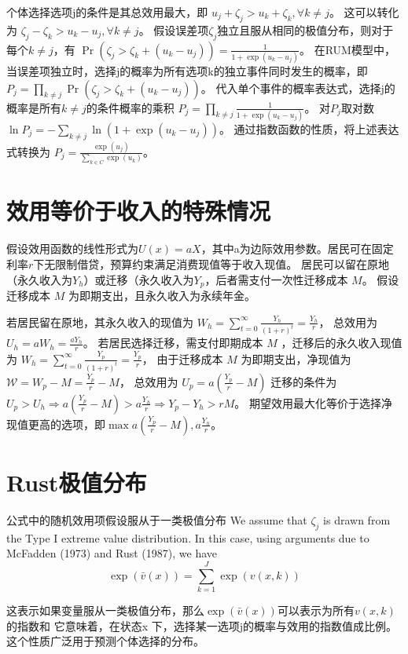 \documentclass[a4paper,12pt,oneside]{book} %
\begin{document}
个体选择选项j的条件是其总效用最大，即
$u_j + \zeta_j > u_k + \zeta_k, \forall k \neq j$。
这可以转化为
$\zeta_j - \zeta_k > u_k - u_j, \forall k \neq j$。
假设误差项$\zeta_j$独立且服从相同的极值分布，则对于每个$k \neq j$，有
$\Pr(\zeta_j > \zeta_k + (u_k - u_j)) = \frac{1}{1 + \exp(u_k - u_j)}$。
在RUM模型中，当误差项独立时，选择j的概率为所有选项k的独立事件同时发生的概率，即
$P_j = \prod\limits_{k \neq j} \Pr(\zeta_j > \zeta_k + (u_k - u_j))$。
代入单个事件的概率表达式，选择j的概率是所有$k \neq j$的条件概率的乘积
$P_j = \prod\limits_{k \neq j} \frac{1}{1 + \exp(u_k - u_j)}$。
对$P_j$取对数
$\ln P_j = - \sum_{k \neq j} \ln(1 + \exp(u_k - u_j))$。
通过指数函数的性质，将上述表达式转换为
$P_j = \frac{\exp(u_j)}{\sum\limits_{k \in C} \exp(u_k)}$。

\chapter{效用等价于收入的特殊情况}
假设效用函数的线性形式为$U(x)=a X$，其中a为边际效用参数。居民可在固定利率$r$下无限制借贷，预算约束满足消费现值等于收入现值。
居民可以留在原地（永久收入为$Y_h$）或迁移（永久收入为$Y_p$，后者需支付一次性迁移成本 $M$。
假设迁移成本 
$M$
为即期支出，且永久收入为永续年金。

若居民留在原地，其永久收入的现值为
$W_h = \sum\limits_{t=0}^\infty \frac{Y_h}{(1+r)^t}=\frac{Y_h}{r}$，
总效用为$U_h=a W_h = \frac{a Y_h}{r}$。
若居民选择迁移，需支付即期成本 
$M$
，迁移后的永久收入现值为
$W_h = \sum\limits_{t=0}^\infty \frac{Y_p}{(1+r)^t}=\frac{Y_p}{r}$，
由于迁移成本 
$M$
为即期支出，净现值为
$\mathcal{W}=W_p-M=\frac{Y_p}{r}-M$，
总效用为
$U_p=a(\frac{Y_p}{r}-M)$
迁移的条件为$U_p>U_h \Rightarrow a(\frac{Y_p}{r}-M) > a \frac{ Y_h}{r} \Rightarrow Y_p-Y_h > rM$。
期望效用最大化等价于选择净现值更高的选项，即$\max{a(\frac{Y_p}{r}-M), a \frac{ Y_h}{r}}$。

\chapter{Rust极值分布}
公式中的随机效用项假设服从于一类极值分布
We assume that $\zeta_j$ is drawn from the Type I extreme value distribution. In this case, using arguments due to McFadden (1973) and Rust (1987), we have
$$\exp\left(\bar{v}(x)\right) = \sum_{k=1}^J \exp\left(v(x, k)\right)$$

这表示如果变量服从一类极值分布，那么$\exp\left(\bar{v}(x)\right)$可以表示为所有$v(x, k)$的指数和
它意味着，在状态x 下，选择某一选项j的概率与效用的指数值成比例。
这个性质广泛用于预测个体选择的分布。
\end{document}
